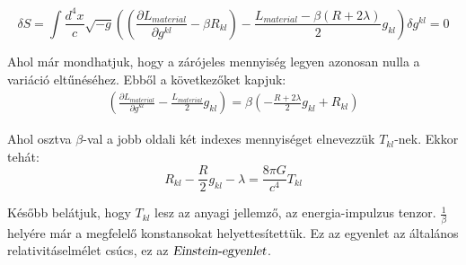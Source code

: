 \documentclass[a4paper,12pt]{article}
\begin{document}
\begin{equation*}
    \delta S = \int \frac{d^{4}x}{c}\sqrt{-g}((\frac{\partial L_{material}}{\partial g^{kl}} - \beta R_{kl}) - \frac{L_{material} - \beta(R + 2\lambda)}{2}g_{kl})\delta g^{kl} = 0
\end{equation*}
\par Ahol már mondhatjuk, hogy a zárójeles mennyiség legyen azonosan nulla a variáció eltűnéséhez. Ebből a következőket kapjuk:
\begin{gather*}
    (\frac{\partial L_{material}}{\partial g^{kl}} - \frac{L_{material}}{2}g_{kl}) = \beta(-\frac{R+2\lambda}{2}g_{kl} + R_{kl})
\end{gather*}
\par Ahol osztva $\beta$-val a jobb oldali két indexes mennyiséget elnevezzük $T_{kl}$-nek. Ekkor tehát:
\begin{equation*}
    R_{kl} - \frac{R}{2}g_{kl} - \lambda = \frac{8\pi G}{c^{4}}T_{kl}
\end{equation*}
\par Később belátjuk, hogy $T_{kl}$ lesz az anyagi jellemző, az energia-impulzus tenzor. $\frac{1}{\beta}$ helyére már a megfelelő konstansokat helyettesítettük. Ez az egyenlet az általános relativitáselmélet csúcs, ez az $\textsl{Einstein-egyenlet}$.
\end{document}
